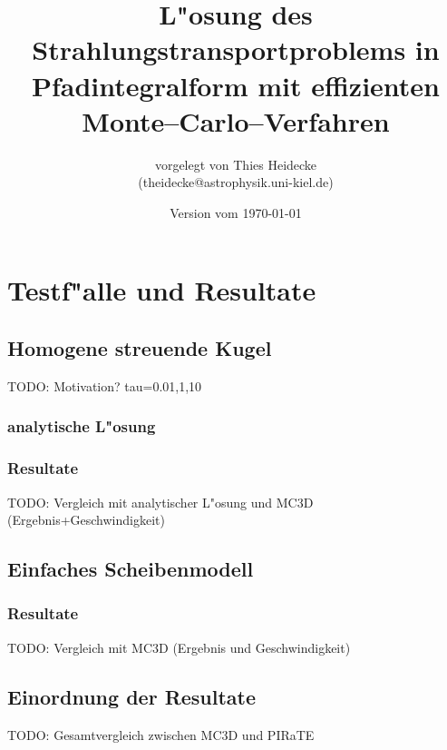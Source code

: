 \documentclass[12pt,a4paper,DIVcalc,titlepage,twoside]{scrbook}
\begin{document}
	\titlehead{Christian--Albrechts--Universit"at zu Kiel\\ Institut f"ur Theoretische Physik und Astrophysik}
	\subject{Diplomarbeit}
	\title{L"osung des Strahlungstransportproblems in Pfadintegralform mit effizienten Monte--Carlo--Verfahren}
	\author{vorgelegt von Thies Heidecke\\(theidecke@astrophysik.uni-kiel.de)}
	\publishers{betreut durch Prof. Sebastian Wolf}
	\date{Version vom \today}
	\maketitle

	\tableofcontents
	
	\newcommand{\location}[1]{\mathbf{#1}}
	\newcommand{\scatter}[1]{\overset{#1}{\leftrightsquigarrow}}
	\newcommand{\normalized}[1]{\frac{#1}{||#1||}}
	
	
	
	
	
	
	
	\chapter{Testf"alle und Resultate}
	\section{Homogene streuende Kugel}
	TODO: Motivation? tau=0.01,1,10
	\subsection{analytische L"osung}
	\subsection{Resultate}
	TODO: Vergleich mit analytischer L"osung und MC3D (Ergebnis+Geschwindigkeit)
	\section{Einfaches Scheibenmodell}
	\subsection{Resultate}
	TODO: Vergleich mit MC3D (Ergebnis und Geschwindigkeit)
	\section{Einordnung der Resultate}
	TODO: Gesamtvergleich zwischen MC3D und PIRaTE
	
\end{document}
